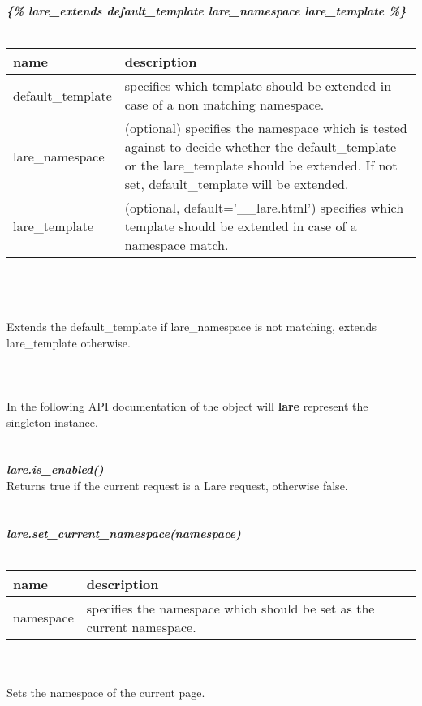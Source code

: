 \newpage{}
\noindent{}\large{\textbf{\textit{\{\% lare\_extends default\_template lare\_namespace lare\_template \%\}}}}
\\
\\
\begin{tabular}{|p{4cm}|p{9cm}|}
    \hline
    \textbf{name} & \textbf{description} \\
    \hline
    default\_template & specifies which template should be extended in case of a non matching namespace. \\
    \hline
    lare\_namespace & (optional) specifies the namespace which is tested against to decide whether the default\_template or the lare\_template should be extended. If not set, default\_template will be extended. \\
    \hline
    lare\_template & (optional, default='\_\_lare.html') specifies which template should be extended in case of a namespace match. \\
    \hline
\end{tabular}
\\
\\
\\
Extends the default\_template if lare\_namespace is not matching, extends lare\_template otherwise.
\\
\\
\\
\\
In the following API documentation of the \textbf{\lare{}} object will \textbf{lare} represent the singleton instance.
\\
\\
\\
\large{\textbf{\textit{lare.is\_enabled()}}}
\\
Returns true if the current request is a Lare request, otherwise false.
\\
\\
\\
\large{\textit{\textbf{lare.set\_current\_namespace(namespace)}}}
\\
\\
\begin{tabular}{|p{4cm}|p{9cm}|}
    \hline
    \textbf{name} & \textbf{description} \\
    \hline
    namespace & specifies the namespace which should be set as the current namespace. \\
    \hline
\end{tabular}
\\
\\
Sets the namespace of the current page.
